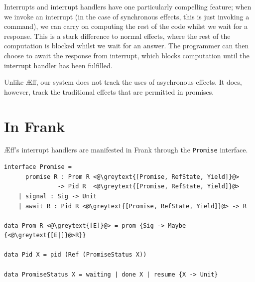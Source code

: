 \documentclass[msc,deptreport,cs]{infthesis} %
\newcommand{\code}[1]{\lstinline{#1}}
\newcommand{\greytext}[1]{\textcolor{black!40}{#1}}
\newcommand\aeff{{\AE}ff\xspace}
\begin{document}
Interrupts and interrupt handlers have one particularly compelling feature; when
we invoke an interrupt (in the case of synchronous effects, this is just
invoking a command), we can carry on computing the rest of the code whilst we
wait for a response. This is a stark difference to normal effects, where the
rest of the computation is blocked whilst we wait for an answer. The programmer
can then choose to await the response from interrupt, which blocks
computation until the interrupt handler has been fulfilled.

Unlike \aeff, our system does not track the uses of asychronous effects. It
does, however, track the traditional effects that are permitted in promises.



\section{In Frank}

\aeff's interrupt handlers are manifested in Frank through the \code{Promise}
interface.





\begin{lstlisting}
interface Promise =
      promise R : Prom R <@\greytext{[Promise, RefState, Yield]}@>
               -> Pid R  <@\greytext{[Promise, RefState, Yield]}@>
    | signal : Sig -> Unit
    | await R : Pid R <@\greytext{[Promise, RefState, Yield]}@> -> R

data Prom R <@\greytext{[E]}@> = prom {Sig -> Maybe {<@\greytext{[E|]}@>R}}

data Pid X = pid (Ref (PromiseStatus X))

data PromiseStatus X = waiting | done X | resume {X -> Unit}
\end{lstlisting}
\end{document}
